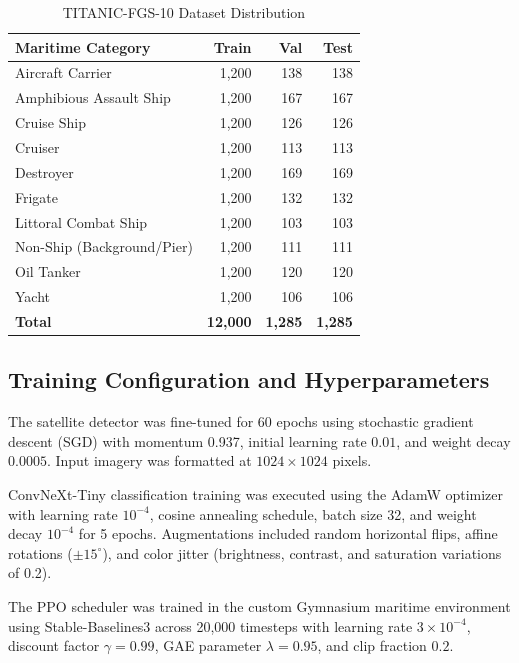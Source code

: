\documentclass[conference]{IEEEtran}
\begin{document}
\begin{table}[htbp]
\centering
\caption{TITANIC-FGS-10 Dataset Distribution}
\label{tab:titanic_distribution}
\begin{tabular}{lrrr}
\toprule
\textbf{Maritime Category} & \textbf{Train} & \textbf{Val} & \textbf{Test} \\
\midrule
Aircraft Carrier           & 1,200 & 138 & 138 \\
Amphibious Assault Ship    & 1,200 & 167 & 167 \\
Cruise Ship                & 1,200 & 126 & 126 \\
Cruiser                    & 1,200 & 113 & 113 \\
Destroyer                  & 1,200 & 169 & 169 \\
Frigate                    & 1,200 & 132 & 132 \\
Littoral Combat Ship       & 1,200 & 103 & 103 \\
Non-Ship (Background/Pier) & 1,200 & 111 & 111 \\
Oil Tanker                 & 1,200 & 120 & 120 \\
Yacht                      & 1,200 & 106 & 106 \\
\midrule
\textbf{Total}             & \textbf{12,000} & \textbf{1,285} & \textbf{1,285} \\
\bottomrule
\end{tabular}
\end{table}

\subsection{Training Configuration and Hyperparameters}
The satellite detector was fine-tuned for 60 epochs using stochastic gradient descent (SGD) with momentum 0.937, initial learning rate $0.01$, and weight decay $0.0005$. Input imagery was formatted at $1024\times1024$ pixels.

ConvNeXt-Tiny classification training was executed using the AdamW optimizer with learning rate $10^{-4}$, cosine annealing schedule, batch size 32, and weight decay $10^{-4}$ for 5 epochs. Augmentations included random horizontal flips, affine rotations ($\pm 15^\circ$), and color jitter (brightness, contrast, and saturation variations of 0.2).

The PPO scheduler was trained in the custom Gymnasium maritime environment using Stable-Baselines3 across 20,000 timesteps with learning rate $3 \times 10^{-4}$, discount factor $\gamma = 0.99$, GAE parameter $\lambda = 0.95$, and clip fraction $0.2$.
\end{document}
